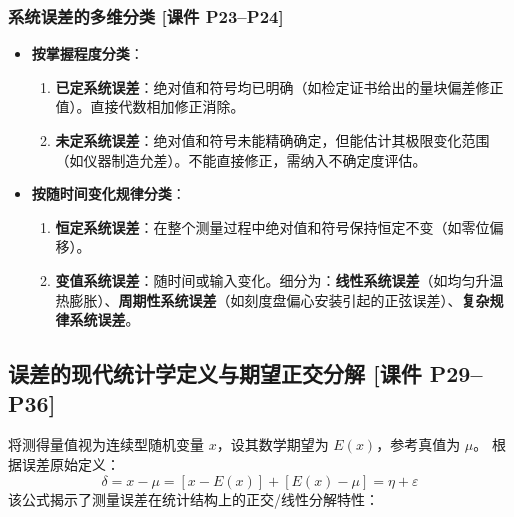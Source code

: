 \documentclass[11pt,a4paper]{ctexart}
\begin{document}
\subsubsection{系统误差的多维分类 [课件 P23--P24]}
\begin{itemize}
    \item \textbf{按掌握程度分类}：
    \begin{enumerate}
        \item \textbf{已定系统误差}：绝对值和符号均已明确（如检定证书给出的量块偏差修正值）。直接代数相加修正消除。
        \item \textbf{未定系统误差}：绝对值和符号未能精确确定，但能估计其极限变化范围（如仪器制造允差）。不能直接修正，需纳入不确定度评估。
    \end{enumerate}
    \item \textbf{按随时间变化规律分类}：
    \begin{enumerate}
        \item \textbf{恒定系统误差}：在整个测量过程中绝对值和符号保持恒定不变（如零位偏移）。
        \item \textbf{变值系统误差}：随时间或输入变化。细分为：\textbf{线性系统误差}（如均匀升温热膨胀）、\textbf{周期性系统误差}（如刻度盘偏心安装引起的正弦误差）、\textbf{复杂规律系统误差}。
    \end{enumerate}
\end{itemize}

\subsection{误差的现代统计学定义与期望正交分解 \textnormal{[课件 P29--P36]}}

将测得量值视为连续型随机变量 $x$，设其数学期望为 $E(x)$，参考真值为 $\mu$。
根据误差原始定义：
\begin{equation}
    \delta = x - \mu = [x - E(x)] + [E(x) - \mu] = \eta + \varepsilon
\end{equation}
该公式揭示了测量误差在统计结构上的正交/线性分解特性：
\end{document}
